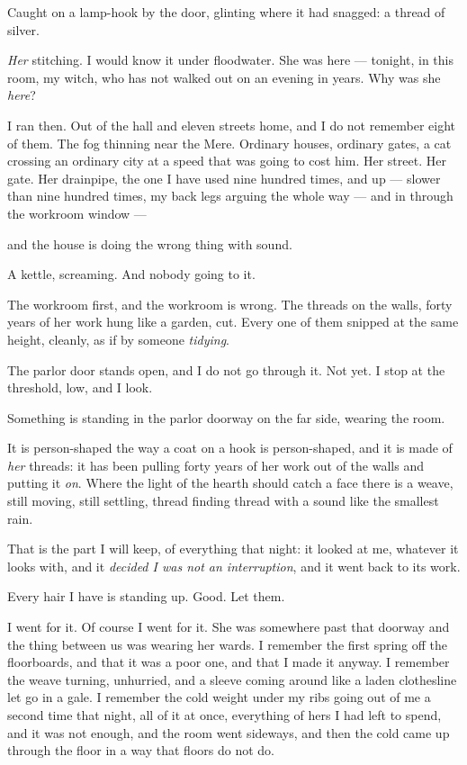 Caught on a lamp-hook by the door, glinting where it had snagged: a thread of silver.

\emph{Her} stitching. I would know it under floodwater. She was here --- tonight, in this room, my witch, who has not walked out on an evening in years. Why was she \emph{here}?

I ran then. Out of the hall and eleven streets home, and I do not remember eight of them. The fog thinning near the Mere. Ordinary houses, ordinary gates, a cat crossing an ordinary city at a speed that was going to cost him. Her street. Her gate. Her drainpipe, the one I have used nine hundred times, and up --- slower than nine hundred times, my back legs arguing the whole way --- and in through the workroom window ---

and the house is doing the wrong thing with sound.

A kettle, screaming. And nobody going to it.

\scenebreak

The workroom first, and the workroom is wrong. The threads on the walls, forty years of her work hung like a garden, cut. Every one of them snipped at the same height, cleanly, as if by someone \emph{tidying}.

The parlor door stands open, and I do not go through it. Not yet. I stop at the threshold, low, and I look.

Something is standing in the parlor doorway on the far side, wearing the room.

It is person-shaped the way a coat on a hook is person-shaped, and it is made of \emph{her} threads: it has been pulling forty years of her work out of the walls and putting it \emph{on}. Where the light of the hearth should catch a face there is a weave, still moving, still settling, thread finding thread with a sound like the smallest rain.

That is the part I will keep, of everything that night: it looked at me, whatever it looks with, and it \emph{decided I was not an interruption}, and it went back to its work.

Every hair I have is standing up. Good. Let them.

I went for it. Of course I went for it. She was somewhere past that doorway and the thing between us was wearing her wards. I remember the first spring off the floorboards, and that it was a poor one, and that I made it anyway. I remember the weave turning, unhurried, and a sleeve coming around like a laden clothesline let go in a gale. I remember the cold weight under my ribs going out of me a second time that night, all of it at once, everything of hers I had left to spend, and it was not enough, and the room went sideways, and then the cold came up through the floor in a way that floors do not do.

